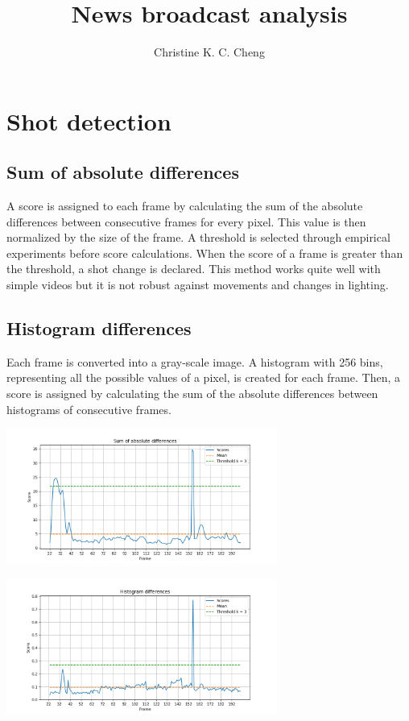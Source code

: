 \documentclass{article}
\title{News broadcast analysis}
\author{
	Christine K. C. Cheng
}
\begin{document}
\maketitle

\section{Shot detection}
\subsection*{Sum of absolute differences}
A score is assigned to each frame by calculating the sum of the absolute differences between consecutive frames for every pixel. This value is then normalized by the size of the frame. A threshold is selected through empirical experiments before score calculations. When the score of a frame is greater than the threshold, a shot change is declared.
This method works quite well with simple videos but it is not robust against movements and changes in lighting.

\subsection*{Histogram differences}
Each frame is converted into a gray-scale image. A histogram with 256 bins, representing all the possible values of a pixel, is created for each frame. Then, a score is assigned by calculating the sum of the absolute differences between histograms of consecutive frames.

\vspace*{20pt}
\begin{minipage}{0.5\linewidth}
 \label{fig: clip_1_sad2}
\centering
\includegraphics[width=3.5in]{../output/clip_1_score_sad2.png}
\end{minipage}%
\begin{minipage}{0.5\linewidth}
 \label{fig: clip_1_hd}
\centering
\includegraphics[width=3.5in]{../output/clip_1_score_hd.png}
\end{minipage}
\end{document}
